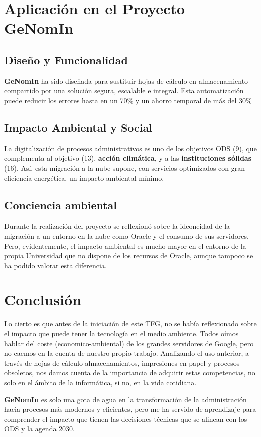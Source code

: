 \section{Aplicación en el Proyecto GeNomIn}
\subsection{Diseño y Funcionalidad}
\textbf{GeNomIn} ha sido diseñada para sustituir hojas de cálculo en almacenamiento compartido por una solución segura, escalable e integral. Esta automatización puede reducir los errores hasta en un 70\% y un ahorro temporal de más del 30\%
\subsection{Impacto Ambiental y Social}
La digitalización de procesos administrativos es uno de los objetivos \acrshort{ODS} (9), que complementa al objetivo (13), \textbf{acción climática}, y a las \textbf{instituciones sólidas} (16). Así, esta migración a la nube supone, con servicios optimizados con gran eficiencia energética, un impacto ambiental mínimo.
\subsection{Conciencia ambiental}
Durante la realización del proyecto se reflexionó sobre la ideoneidad de la migración a un entorno en la nube como Oracle y el consumo de sus servidores. Pero, evidentemente, el impacto ambiental es mucho mayor en el entorno de la propia Universidad que no dispone de los recursos de Oracle, aunque tampoco se ha podido valorar esta diferencia.

\section{Conclusión}

Lo cierto es que antes de la iniciación de este \acrshort{TFG}, no se había reflexionado sobre el impacto que puede tener la tecnología en el medio ambiente. Todos oímos hablar del coste (economico-ambiental) de los grandes servidores de Google, pero no caemos en la cuenta de nuestro propio trabajo.
Analizando el uso anterior, a través de hojas de cálculo almacenamientos, impresiones en papel y procesos obsoletos, nos damos cuenta de la importancia de adquirir estas competencias, no solo en el ámbito de la informática, si no, en la vida cotidiana.

\textbf{GeNomIn} es solo una gota de agua en la transformación de la administración hacia procesos más modernos y eficientes, pero me ha servido de aprendizaje para comprender el impacto que tienen las decisiones técnicas que se alinean con los \acrshort{ODS} y la agenda 2030.